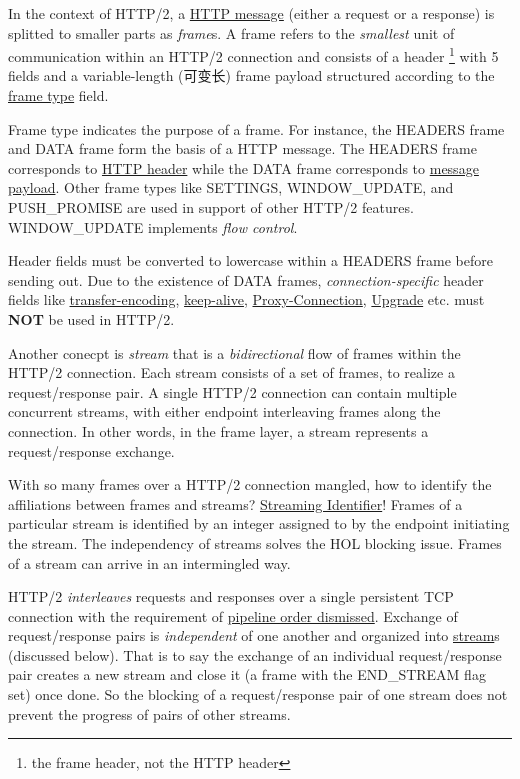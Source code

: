 In the context of HTTP/2, a \uline{HTTP message} (either a request
or a response) is splitted to smaller parts as \textit{frame}s. A
frame refers to the \textit{smallest} unit of communication within
an HTTP/2 connection and consists of a header \footnote{the frame
  header, not the HTTP header} with 5 fields and a variable-length
(可变长) frame payload structured according to the \uline{frame
  type} field.

Frame type indicates the purpose of a frame. For instance, the
HEADERS frame and DATA frame form the basis of a HTTP message. The
HEADERS frame corresponds to \uline{HTTP header} while the DATA
frame corresponds to \uline{message payload}. Other frame types like
SETTINGS, WINDOW\_UPDATE, and PUSH\_PROMISE are used in support of
other HTTP/2 features. WINDOW\_UPDATE implements \textit{flow
  control}.

Header fields must be converted to lowercase within a HEADERS
frame before sending out. Due to the existence of DATA frames,
\textit{connection-specific} header fields like
\uline{transfer-encoding}, \uline{keep-alive},
\uline{Proxy-Connection}, \uline{Upgrade} etc. must \textbf{NOT}
be used in HTTP/2.

Another conecpt is \textit{stream} that is a
\textit{bidirectional} flow of frames within the HTTP/2
connection. Each stream consists of a set of frames, to realize a
request/response pair. A single HTTP/2 connection can contain
multiple concurrent streams, with either endpoint interleaving
frames along the connection. In other words, in the frame layer, a
stream represents a request/response exchange.

With so many frames over a HTTP/2 connection mangled, how to
identify the affiliations between frames and streams?
\uline{Streaming Identifier}! Frames of a particular stream is
identified by an integer assigned to by the endpoint initiating
the stream. The independency of streams solves the HOL blocking
issue. Frames of a stream can arrive in an intermingled way.

HTTP/2 \textit{interleaves} requests and responses over a single
persistent TCP connection with the requirement of
\href{https://stackoverflow.com/q/34478967}{pipeline order
  dismissed}. Exchange of request/response pairs is
\textit{independent} of one another and organized into
\uline{stream}s (discussed below). That is to say the exchange of
an individual request/response pair creates a new stream and close
it (a frame with the END\_STREAM flag set) once done. So the
blocking of a request/response pair of one stream does not prevent
the progress of pairs of other streams.

